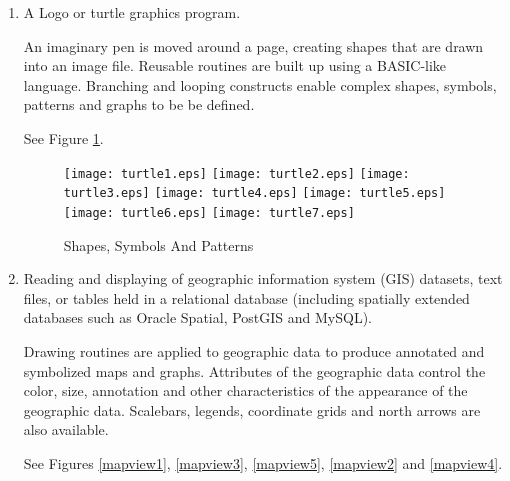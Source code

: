 \begin{enumerate}
\item

A Logo or turtle graphics program.

An imaginary pen is moved around a page,
creating shapes that are drawn into an image file.
Reusable routines are built up using a BASIC-like language.
Branching and looping constructs enable complex shapes, symbols, patterns
and graphs to be be defined.

See Figure \ref{turtle}.

\begin{figure}[htb]
\texttt{[image: turtle1.eps]}
\texttt{[image: turtle2.eps]}
\texttt{[image: turtle3.eps]}
\texttt{[image: turtle4.eps]}
\texttt{[image: turtle5.eps]}
\texttt{[image: turtle6.eps]}
\texttt{[image: turtle7.eps]}
\caption{Shapes, Symbols And Patterns}
\label{turtle}
\end{figure}

\item

Reading and displaying of geographic information
system (GIS) datasets,
text files, or tables held in a relational database
(including spatially extended databases such as Oracle Spatial,
PostGIS and MySQL).

Drawing routines are applied to geographic data to produce annotated and
symbolized maps and graphs.  Attributes of the geographic data control
the color, size, annotation and other characteristics of the
appearance of the geographic data.
Scalebars, legends, coordinate grids and north arrows are also available.

See Figures \ref{mapview1}, \ref{mapview3}, \ref{mapview5}, \ref{mapview2}
and \ref{mapview4}.


\end{enumerate}
